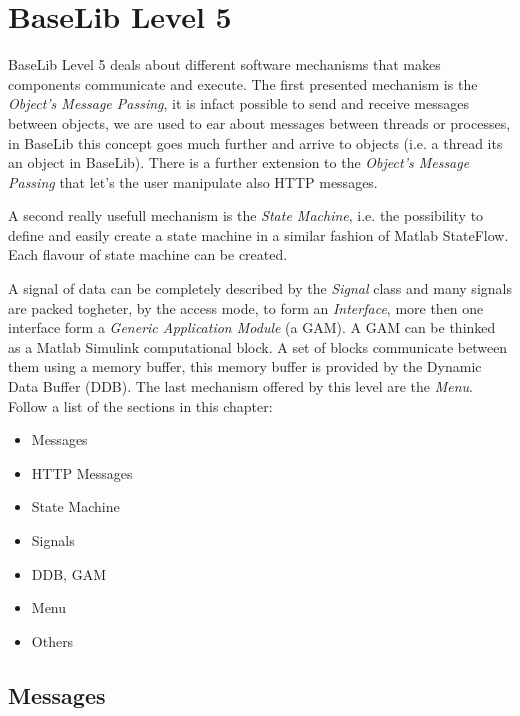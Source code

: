 \chapter{BaseLib Level 5}

BaseLib Level 5 deals about different software mechanisms that makes components communicate and execute. The first presented mechanism is the \textit{Object's Message Passing}, it is infact possible to send and receive messages between objects, we are used to ear about messages between threads or processes, in BaseLib this concept goes much further and arrive to objects (i.e. a thread its an object in BaseLib). There is a further extension to the \textit{Object's Message Passing} that let's the user manipulate also HTTP messages.

A second really usefull mechanism is the \textit{State Machine}, i.e. the possibility to define and easily create a state machine in a similar fashion of Matlab StateFlow. Each flavour of state machine can be created.

A signal of data can be completely described by the \textit{Signal} class and many signals are packed togheter, by the access mode, to form an \textit{Interface}, more then one interface form a \textit{Generic Application Module} (a GAM). A GAM can be thinked as a Matlab Simulink computational block. A set of blocks communicate between them using a memory buffer, this memory buffer is provided by the Dynamic Data Buffer (DDB).
The last mechanism offered by this level are the \textit{Menu}. \\

Follow a list of the sections in this chapter:
\begin{itemize}
 \item Messages
 \item HTTP Messages

 \item State Machine

 \item Signals
 \item DDB, GAM

 \item Menu
 \item Others
\end{itemize}



\section{Messages}

